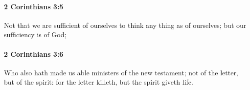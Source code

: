 		\paragraph{2 Corinthians 3:5} %
			\label{2CORINTHIANS-3-5}

			Not that we are sufficient of ourselves to think any thing as of ourselves; but our sufficiency is of God;

			\begin{framed}
			\scriptsize
				\begin{compactdesc}
					\item[SBLG] 
				\end{compactdesc}
			\end{framed}

		\paragraph{2 Corinthians 3:6} %
			\label{2CORINTHIANS-3-6}

			Who also hath made us able ministers of the new testament; not of the letter, but of the spirit: for the letter killeth, but the spirit giveth life.

